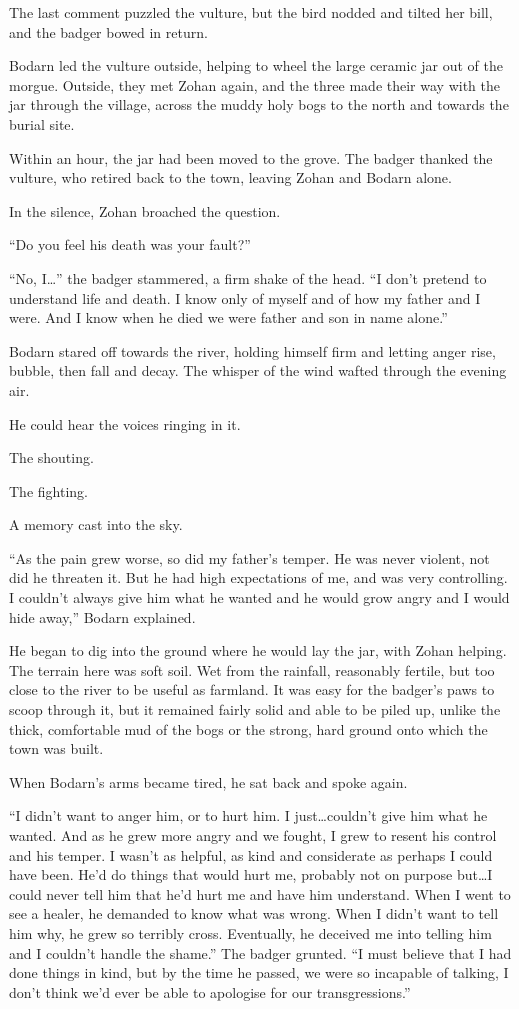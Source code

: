 The last comment puzzled the vulture, but the bird nodded and tilted her bill, and the badger bowed in return.

Bodarn led the vulture outside, helping to wheel the large ceramic jar out of the morgue. Outside, they met Zohan again, and the three made their way with the jar through the village, across the muddy holy bogs to the north and towards the burial site.

\secdiv

\noindent Within an hour, the jar had been moved to the grove. The badger thanked the vulture, who retired back to the town, leaving Zohan and Bodarn alone.

In the silence, Zohan broached the question.

``Do you feel his death was your fault?''

``No, I\ldots'' the badger stammered, a firm shake of the head. ``I don't pretend to understand life and death. I know only of myself and of how my father and I were. And I know when he died we were father and son in name alone.''

Bodarn stared off towards the river, holding himself firm and letting anger rise, bubble, then fall and decay. The whisper of the wind wafted through the evening air.

He could hear the voices ringing in it.

The shouting.

The fighting.

A memory cast into the sky.

``As the pain grew worse, so did my father's temper. He was never violent, not did he threaten it. But he had high expectations of me, and was very controlling. I couldn't always give him what he wanted and he would grow angry and I would hide away,'' Bodarn explained.

He began to dig into the ground where he would lay the jar, with Zohan helping. The terrain here was soft soil. Wet from the rainfall, reasonably fertile, but too close to the river to be useful as farmland. It was easy for the badger's paws to scoop through it, but it remained fairly solid and able to be piled up, unlike the thick, comfortable mud of the bogs or the strong, hard ground onto which the town was built.

When Bodarn's arms became tired, he sat back and spoke again.

``I didn't want to anger him, or to hurt him. I just\ldots{}couldn't give him what he wanted. And as he grew more angry and we fought, I grew to resent his control and his temper. I wasn't as helpful, as kind and considerate as perhaps I could have been. He'd do things that would hurt me, probably not on purpose but\ldots{}I could never tell him that he'd hurt me and have him understand. When I went to see a healer, he demanded to know what was wrong. When I didn't want to tell him why, he grew so terribly cross. Eventually, he deceived me into telling him and I couldn't handle the shame.'' The badger grunted. ``I must believe that I had done things in kind, but by the time he passed, we were so incapable of talking, I don't think we'd ever be able to apologise for our transgressions.''

